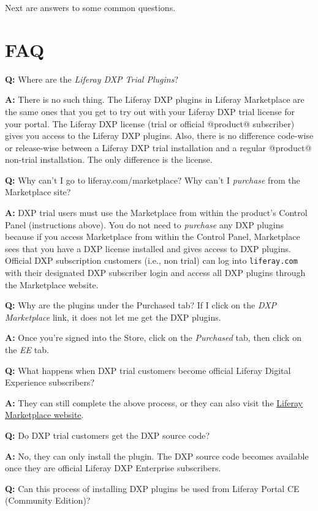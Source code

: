 Next are answers to some common questions.

\section{FAQ}\label{faq}

\textbf{Q:} Where are the \emph{Liferay DXP Trial Plugins}?

\textbf{A:} There is no such thing. The Liferay DXP plugins in Liferay
Marketplace are the same ones that you get to try out with your Liferay
DXP trial license for your portal. The Liferay DXP license (trial or
official @product@ subscriber) gives you access to the Liferay DXP
plugins. Also, there is no difference code-wise or release-wise between
a Liferay DXP trial installation and a regular @product@ non-trial
installation. The only difference is the license.

\textbf{Q:} Why can't I go to liferay.com/marketplace? Why can't I
\emph{purchase} from the Marketplace site?

\textbf{A:} DXP trial users must use the Marketplace from within the
product's Control Panel (instructions above). You do not need to
\emph{purchase} any DXP plugins because if you access Marketplace from
within the Control Panel, Marketplace sees that you have a DXP license
installed and gives access to DXP plugins. Official DXP subscription
customers (i.e., non trial) can log into \texttt{liferay.com} with their
designated DXP subscriber login and access all DXP plugins through the
Marketplace website.

\textbf{Q:} Why are the plugins under the Purchased tab? If I click on
the \emph{DXP Marketplace} link, it does not let me get the DXP plugins.

\textbf{A:} Once you're signed into the Store, click on the
\emph{Purchased} tab, then click on the \emph{EE} tab.

\textbf{Q:} What happens when DXP trial customers become official
Liferay Digital Experience subscribers?

\textbf{A:} They can still complete the above process, or they can also
visit the \href{https://www.liferay.com/marketplace}{Liferay Marketplace
website}.

\textbf{Q:} Do DXP trial customers get the DXP source code?

\textbf{A:} No, they can only install the plugin. The DXP source code
becomes available once they are official Liferay DXP Enterprise
subscribers.

\textbf{Q:} Can this process of installing DXP plugins be used from
Liferay Portal CE (Community Edition)?

